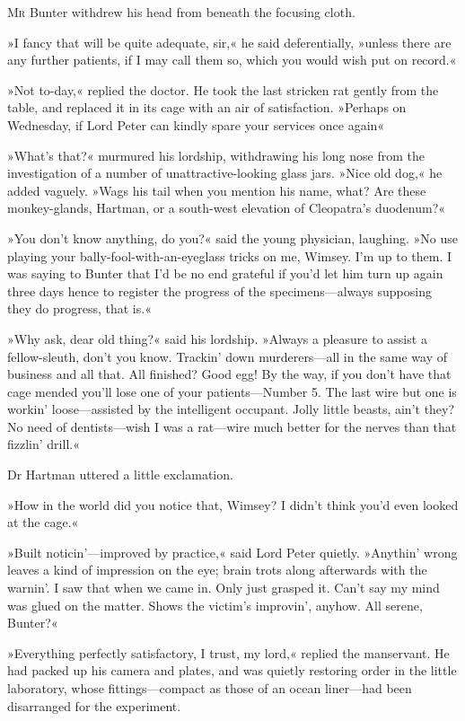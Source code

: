 
\lettrine[lines=4]{M}{r} Bunter withdrew his head from beneath the focusing cloth.

\zz
»I fancy that will be quite adequate, sir,« he said deferentially, »unless there are any further patients, if I may call them so, which you would wish put on record.«

»Not to-day,« replied the doctor. He took the last stricken rat gently from the table, and replaced it in its cage with an air of satisfaction. »Perhaps on Wednesday, if Lord Peter can kindly spare your services once again\longdash«

»What's that?« murmured his lordship, withdrawing his long nose from the investigation of a number of unattractive-looking glass jars. »Nice old dog,« he added vaguely. »Wags his tail when you mention his name, what? Are these monkey-glands, Hartman, or a south-west elevation of Cleopatra's duodenum?«

»You don't know anything, do you?« said the young physician, laughing. »No use playing your bally-fool-with-an-eyeglass tricks on me, Wimsey. I'm up to them. I was saying to Bunter that I'd be no end grateful if you'd let him turn up again three days hence to register the progress of the specimens—always supposing they do progress, that is.«

»Why ask, dear old thing?« said his lordship. »Always a pleasure to assist a fellow-sleuth, don't you know. Trackin' down murderers—all in the same way of business and all that. All finished? Good egg! By the way, if you don't have that cage mended you'll lose one of your patients—Number 5. The last wire but one is workin' loose—assisted by the intelligent occupant. Jolly little beasts, ain't they? No need of dentists—wish I was a rat—wire much better for the nerves than that fizzlin' drill.«

Dr Hartman uttered a little exclamation.

»How in the world did you notice that, Wimsey? I didn't think you'd even looked at the cage.«

»Built noticin'—improved by practice,« said Lord Peter quietly. »Anythin' wrong leaves a kind of impression on the eye; brain trots along afterwards with the warnin'. I saw that when we came in. Only just grasped it. Can't say my mind was glued on the matter. Shows the victim's improvin', anyhow. All serene, Bunter?«

»Everything perfectly satisfactory, I trust, my lord,« replied the manservant. He had packed up his camera and plates, and was quietly restoring order in the little laboratory, whose fittings—compact as those of an ocean liner—had been disarranged for the experiment.

